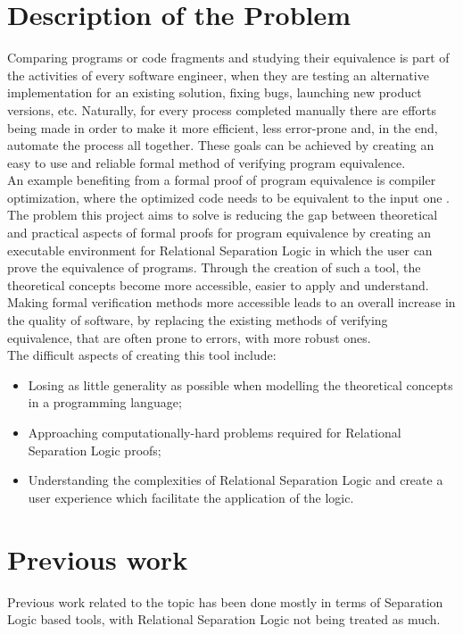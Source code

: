 \documentclass[12pt,a4paper]{article}
\begin{document}
\section{Description of the Problem}
Comparing programs or code fragments and studying their equivalence is part of the activities of every software engineer, when they are testing an alternative implementation for an existing solution, fixing bugs, launching new product versions, etc. Naturally, for every process completed manually there are efforts being made in order to make it more efficient, less error-prone and, in the end, automate the process all together. These goals can be achieved by creating an easy to use and reliable formal  method of verifying program equivalence.
\\

An example benefiting from a formal proof of program equivalence is compiler optimization, where the optimized code needs to be equivalent to the input one \cite{relational}.\\

The problem this project aims to solve is reducing the gap between theoretical and practical aspects of formal proofs for program equivalence by creating an executable environment for Relational Separation Logic in which the user can prove the equivalence of programs. Through the creation of such a tool, the theoretical concepts become more accessible, easier to apply and understand. Making formal verification methods more accessible leads to an overall increase in the quality of software, by replacing the existing methods of verifying equivalence, that are often prone to errors, with more robust ones.\\

The difficult aspects of creating this tool include:
\begin{itemize}
	\item Losing as little generality as possible when modelling the theoretical concepts in a programming language;
	\item Approaching computationally-hard problems required for Relational Separation Logic proofs;
	\item Understanding the complexities of Relational Separation Logic and create a user experience which facilitate the application of the logic.
\end{itemize}

\section{Previous work}
Previous work related to the topic has been done mostly in terms of Separation Logic based tools, with Relational Separation Logic not being treated as much. \\
\end{document}
